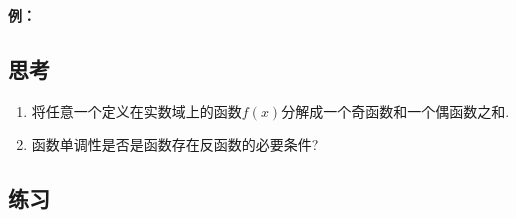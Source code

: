 \documentclass[a4paper,punct=CCT]{ctexbook}
\makeatletter
\theoremstyle{break}
\newif\ifshowsol
\newif\ifshowex
\renewenvironment{proof}[1][\proofname]{\par
  \pushQED{\qed}%
  \normalfont \topsep6\p@\@plus6\p@\relax
  \trivlist
  \item[]\ignorespaces
}{%
  \popQED\endtrivlist\@endpefalse
}
\newenvironment{example}[1][]{\noindent\textbf{例#1：}}{}
\makeatother
\begin{document}
\begin{example}
\begin{proof}
  \end{proof}
\end{example}

\subsection*{思考}

\begin{enumerate}
\item 将任意一个定义在实数域上的函数\(f(x)\)分解成一个奇函数和一个偶函数之和.

  \ifshowsol
  参见奇偶性定义后面的\hyperlink{T:evenodd}{定理}.
  \fi

\item 函数单调性是否是函数存在反函数的必要条件?

  \ifshowsol
  不是.  反例：函数\(y = 1/x\)在定义域上不是单调的,  但是存在反函数且反函数就是它自己.
  \fi
\end{enumerate}

\ifshowex
{}
\subsection*{练习}
\end{document}
